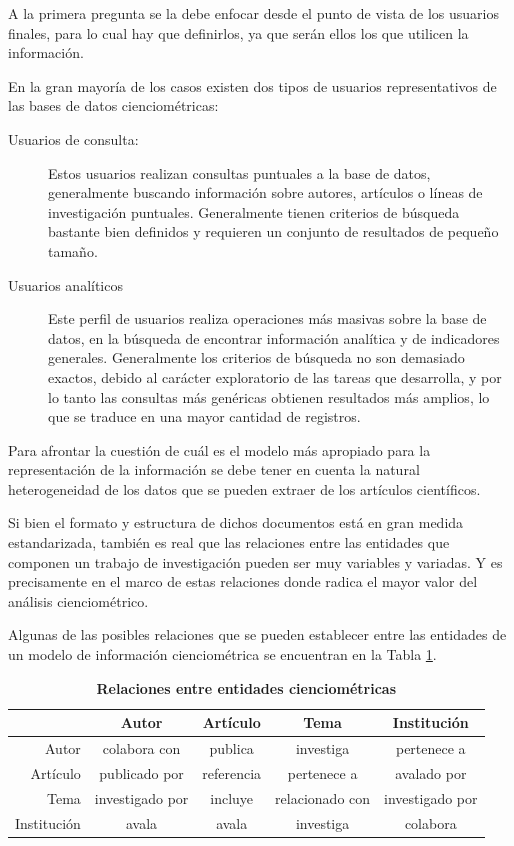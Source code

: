 A la primera pregunta se la debe enfocar desde el punto de vista de los usuarios finales, para lo cual hay que definirlos, ya que serán ellos los que utilicen la información.

En la gran mayoría de los casos existen dos tipos de usuarios representativos de las bases de datos cienciométricas:

\begin{description}
	\item[Usuarios de consulta:] Estos usuarios realizan consultas puntuales a la base de datos, generalmente buscando información sobre autores, artículos o líneas de investigación puntuales. Generalmente tienen criterios de búsqueda bastante bien definidos y requieren un conjunto de resultados de pequeño tamaño.
	\item[Usuarios analíticos] Este perfil de usuarios realiza operaciones más masivas sobre la base de datos, en la búsqueda de encontrar información analítica y de indicadores generales. Generalmente los criterios de búsqueda no son demasiado exactos, debido al carácter exploratorio de las tareas que desarrolla, y por lo tanto las consultas más genéricas obtienen resultados más amplios, lo que se traduce en una mayor cantidad de registros.
\end{description}

Para afrontar la cuestión de cuál es el modelo más apropiado para la representación de la información se debe tener en cuenta la natural heterogeneidad de los datos que se pueden extraer de los artículos científicos. 

Si bien el formato y estructura de dichos documentos está en gran medida estandarizada, también es real que las relaciones entre las entidades que componen un trabajo de investigación pueden ser muy variables y variadas. Y es precisamente en el marco de estas relaciones donde radica el mayor valor del análisis cienciométrico.

Algunas de las posibles relaciones que se pueden establecer entre las entidades de un modelo de información cienciométrica se encuentran en la Tabla \ref{tab:relaciones}.

\begin{table}[ht]
	\centering	
	\caption{\textbf{Relaciones entre entidades cienciométricas}}
	\begin{tabularx}{0.9\linewidth}{rcccc}
		\toprule
		&Autor&Artículo&Tema&Institución\\
		\midrule
		Autor&{\tiny colabora con}&{\tiny publica}&{\tiny investiga}&{\tiny pertenece a}\\
		Artículo&{\tiny publicado por}&{\tiny referencia}&{\tiny pertenece a}& {\tiny avalado por}\\
		Tema&{\tiny investigado por}&{\tiny incluye}& {\tiny relacionado con} & {\tiny investigado por} \\
		Institución& {\tiny avala} & {\tiny avala} & {\tiny investiga} & {\tiny colabora}\\
		\bottomrule
	\end{tabularx}
	
	
	\label{tab:relaciones}
\end{table}%

